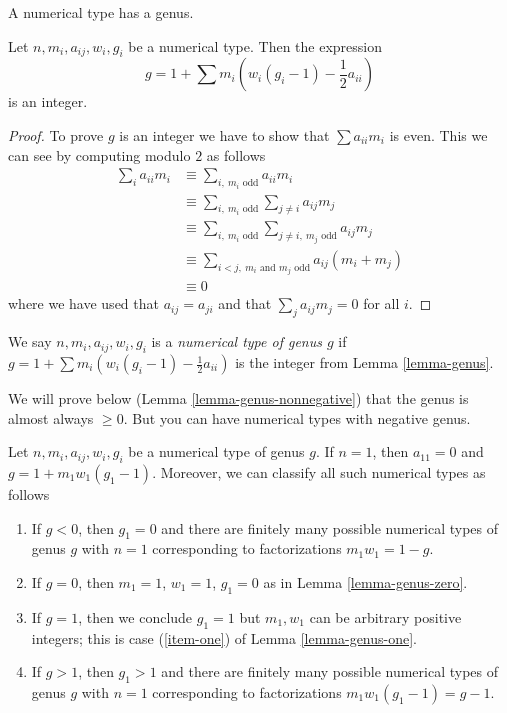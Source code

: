 \noindent
A numerical type has a genus.

\begin{lemma}
\label{lemma-genus}
Let $n, m_i, a_{ij}, w_i, g_i$ be a numerical type. Then the expression
$$
g = 1 + \sum m_i(w_i(g_i - 1) - \frac{1}{2} a_{ii})
$$
is an integer.
\end{lemma}

\begin{proof}
To prove $g$ is an integer we have to show that $\sum a_{ii}m_i$ is even.
This we can see by computing modulo $2$ as follows
\begin{align*}
\sum\nolimits_i a_{ii} m_i 
& \equiv
\sum\nolimits_{i,\ m_i\text{ odd}} a_{ii}m_i \\
& \equiv
\sum\nolimits_{i,\ m_i\text{ odd}} \sum\nolimits_{j \not = i} a_{ij}m_j \\
& \equiv
\sum\nolimits_{i,\ m_i\text{ odd}}
\sum\nolimits_{j \not = i,\ m_j\text{ odd}} a_{ij}m_j \\
& \equiv
\sum\nolimits_{i < j,\ m_i\text{ and }m_j\text{ odd}} a_{ij}(m_i + m_j) \\
& \equiv
0
\end{align*}
where we have used that $a_{ij} = a_{ji}$ and that $\sum_j a_{ij}m_j = 0$
for all $i$.
\end{proof}

\begin{definition}
\label{definition-genus}
We say $n, m_i, a_{ij}, w_i, g_i$ is a {\it numerical type of genus $g$}
if $g = 1 + \sum m_i(w_i(g_i - 1) - \frac{1}{2} a_{ii})$ is the integer
from Lemma \ref{lemma-genus}.
\end{definition}

\noindent
We will prove below (Lemma \ref{lemma-genus-nonnegative}) that the genus
is almost always $\geq 0$. But you can have numerical types with
negative genus.

\begin{lemma}
\label{lemma-irreducible}
Let $n, m_i, a_{ij}, w_i, g_i$ be a numerical type of genus $g$.
If $n = 1$, then $a_{11} = 0$ and $g = 1 + m_1w_1(g_1 - 1)$.
Moreover, we can classify all such numerical types as follows
\begin{enumerate}
\item If $g < 0$, then $g_1 = 0$ and there are finitely many possible
numerical types of genus $g$ with $n = 1$ corresponding to factorizations
$m_1w_1 = 1 - g$.
\item If $g = 0$, then $m_1 = 1$, $w_1 = 1$, $g_1 = 0$
as in Lemma \ref{lemma-genus-zero}.
\item If $g = 1$, then we conclude $g_1 = 1$ but $m_1, w_1$ can be arbitrary
positive integers; this is case
(\ref{item-one}) of Lemma \ref{lemma-genus-one}.
\item If $g > 1$, then $g_1 > 1$ and there are finitely many possible
numerical types of genus $g$ with $n = 1$ corresponding to
factorizations $m_1w_1(g_1 - 1) = g - 1$.
\end{enumerate}
\end{lemma}

